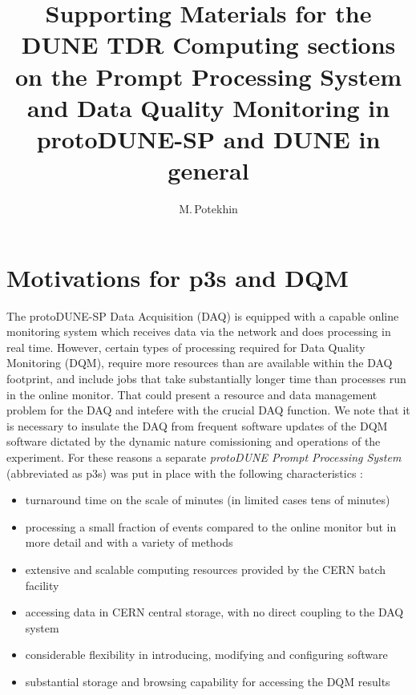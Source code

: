\documentclass[pdftex,12pt,letter]{article}
\newcommand{\pd}{protoDUNE\xspace}
\begin{document}
%
\title{Supporting Materials for the DUNE TDR Computing sections on the Prompt Processing System and Data Quality Monitoring in \pd-SP and DUNE in general}


\author{M.\,Potekhin}

%
\maketitle
%
\section{Motivations for p3s and DQM}
\label{sec:motivations}


The \pd-SP Data Acquisition (DAQ) is equipped with a capable online monitoring system
which receives data via the network and does processing in real time.
However, certain types of processing required for Data Quality Monitoring (DQM), 
require more resources than are available within the DAQ footprint, and include jobs
that take substantially longer time than processes run in the online monitor.
That could present a resource and data management problem for the DAQ and
intefere with the crucial DAQ function. We note that it is necessary to insulate the DAQ
from frequent software updates of the DQM software dictated by the dynamic nature comissioning
and operations of the experiment. 
For these reasons a separate \textit{\pd Prompt Processing System} (abbreviated as p3s) was put
in place  with the following characteristics \cite{eps}:
\begin{itemize} 

\item turnaround time on the scale of minutes (in limited cases tens of minutes)

\item processing a small fraction of events compared  to the online monitor
but in more detail and with a variety of methods

\item extensive and scalable computing resources provided by the CERN batch facility

\item accessing data in CERN central storage, with no direct coupling to the DAQ system

\item considerable flexibility in introducing, modifying and configuring software 

\item substantial storage and browsing capability for accessing the DQM results

\end{itemize}
\end{document}
